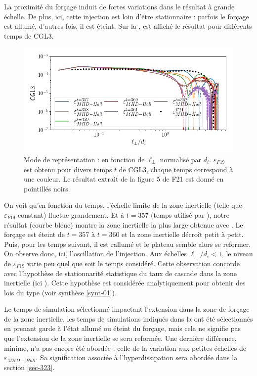  La proximité du forçage induit de fortes variations dans le résultat à grande échelle. De plus, ici, cette injection est loin d'être stationnaire : parfois le forçage est allumé, d'autres fois, il est éteint. Sur la , est affiché le résultat  pour différents temps de CGL3. 
 \begin{figure}[!ht]
  \centering
 \includegraphics[width=0.9\linewidth,trim=0cm 0cm 0cm 0cm, clip=true]{./Mainmatter/Part_3/images_ch2/F19_time}
 \cprotect\caption{Mode de représentation :  en fonction de \ensuremath{\ell_{\perp}} normalisé par \ensuremath{d_i}. \ensuremath{\varepsilon_{F19}} est obtenu pour divers temps \ensuremath{t} de CGL3, chaque temps correspond à une couleur. Le résultat extrait de la figure 5 de F21 est donné en pointillés noirs.}
 \label{fig:compainc_t}
 \end{figure} 
 On voit qu'en fonction du temps, l'échelle limite de la zone inertielle (telle que  $\varepsilon_{F19}$ constant) fluctue grandement. Et à $t=357$ (temps utilisé par ), notre résultat (courbe bleue) montre la zone inertielle la plus large obtenue avec . Le forçage est éteint de $t=357 $ à $t=360$ et la zone inertielle décroît petit à petit.  Puis, pour les temps suivant, il est rallumé et le plateau semble alors se reformer. On observe donc, ici, l'oscillation de l'injection. Aux échelles $\ell_{\perp}/d_i < 1$, le niveau de $\varepsilon_{F19}$ varie peu quel que soit le temps considéré. Cette observation concorde avec l'hypothèse de stationnarité statistique du taux de cascade dans la zone inertielle (ici ). Cette hypothèse est considérée analytiquement pour obtenir des lois du type  (voir synthèse \ref{synt-01}).  
 
 Le temps de simulation sélectionné impactant l'extension dans la zone de forçage de la zone inertielle, les temps de simulations indiqués dans la  ont été sélectionnés en prenant garde à l'état allumé ou éteint du forçage, mais cela ne signifie pas que l'extension de la zone inertielle se sera reformée. Une dernière différence, minime, n'a pas encore été abordée : celle de la variation aux petites échelles de $\varepsilon_{MHD-Hall}$. Sa signification associée à l'hyperdissipation sera abordée dans la section \ref{sec-323}.
 
